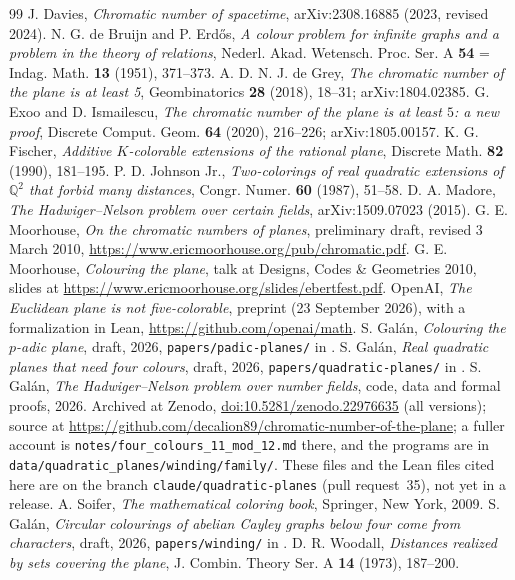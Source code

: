 \documentclass[11pt,a4paper]{amsart}
\theoremstyle{remark}
\newcommand{\Q}{\mathbb{Q}}
\begin{document}
\begin{thebibliography}{99}
 J. Davies, \emph{Chromatic number of spacetime}, arXiv:2308.16885 (2023, revised 2024).
 N. G. de Bruijn and P. Erd\H{o}s, \emph{A colour problem for infinite graphs and a problem in the
theory of relations}, Nederl. Akad. Wetensch. Proc. Ser. A \textbf{54} = Indag. Math. \textbf{13} (1951),
371--373.
 A. D. N. J. de Grey, \emph{The chromatic number of the plane is at least 5}, Geombinatorics
\textbf{28} (2018), 18--31; arXiv:1804.02385.
 G. Exoo and D. Ismailescu, \emph{The chromatic number of the plane is at least $5$: a new proof},
Discrete Comput. Geom. \textbf{64} (2020), 216--226; arXiv:1805.00157.
 K. G. Fischer, \emph{Additive $K$-colorable extensions of the rational plane}, Discrete
Math. \textbf{82} (1990), 181--195.
 P. D. Johnson Jr., \emph{Two-colorings of real quadratic extensions of $\Q^2$ that forbid
many distances}, Congr. Numer. \textbf{60} (1987), 51--58.
 D. A. Madore, \emph{The Hadwiger--Nelson problem over certain fields}, arXiv:1509.07023 (2015).
 G. E. Moorhouse, \emph{On the chromatic numbers of planes}, preliminary draft, revised
3 March 2010, \url{https://www.ericmoorhouse.org/pub/chromatic.pdf}.
 G. E. Moorhouse, \emph{Colouring the plane}, talk at Designs, Codes \& Geometries
2010, slides at \url{https://www.ericmoorhouse.org/slides/ebertfest.pdf}.
 OpenAI, \emph{The Euclidean plane is not five-colorable}, preprint (23 September 2026), with a
formalization in Lean, \url{https://github.com/openai/math}.
 S. Gal\'an, \emph{Colouring the $p$-adic plane}, draft, 2026, \texttt{papers/padic-planes/} in
\cite{Repo}.
 S. Gal\'an, \emph{Real quadratic planes that need four colours}, draft, 2026,
\texttt{papers/quadratic-planes/} in \cite{Repo}.
 S. Gal\'an, \emph{The Hadwiger--Nelson problem over number fields}, code, data and formal
proofs, 2026. Archived at Zenodo, \href{https://doi.org/10.5281/zenodo.22976635}{doi:10.5281/zenodo.22976635}
(all versions); source at \url{https://github.com/decalion89/chromatic-number-of-the-plane}; a fuller account is
\texttt{notes/four\_colours\_11\_mod\_12.md} there, and the programs are in
\texttt{data/quadratic\_planes/winding/family/}. These files and the Lean files cited here are on the branch
\texttt{claude/quadratic-planes} (pull request~35), not yet in a release.
 A. Soifer, \emph{The mathematical coloring book}, Springer, New York, 2009.
 S. Gal\'an, \emph{Circular colourings of abelian Cayley graphs below four come from
characters}, draft, 2026, \texttt{papers/winding/} in \cite{Repo}.
 D. R. Woodall, \emph{Distances realized by sets covering the plane}, J. Combin. Theory Ser. A
\textbf{14} (1973), 187--200.
\end{thebibliography}
\end{document}

